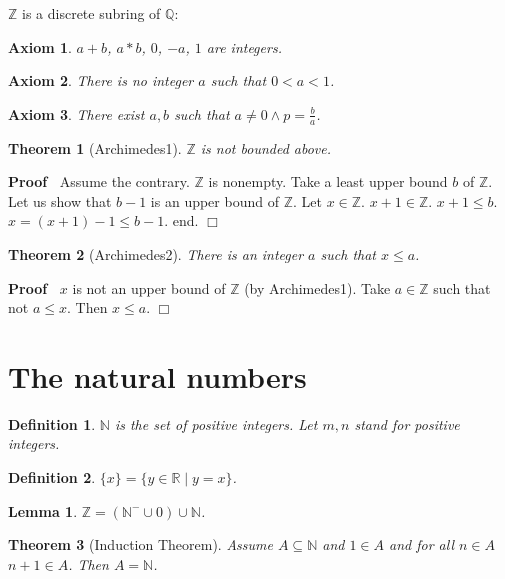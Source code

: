 \documentclass{article}
\newenvironment{proof}{\noindent\textbf{Proof\ }}{\hspace*{\fill}$\Box$\medskip}
\newtheorem{axiom}{Axiom}
\newtheorem{lemma}{Lemma}
\newtheorem{theorem}{Theorem}
\newtheorem{definition}{Definition}
\begin{document}
$\mathbb{Z}$ is a discrete subring of $\mathbb{Q}$:

\begin{axiom} $a + b$, $a * b$, $0$, $-a$, $1$ are integers.
\end{axiom}

\begin{axiom} There is no integer $a$ such that $0 < a < 1$.
\end{axiom}

\begin{axiom} There exist $a,b$ such that 
$a \neq 0 \wedge p = \frac{b}{a}$.
\end{axiom}

\begin{theorem}[Archimedes1] $\mathbb{Z}$ is not bounded above.
\end{theorem}
\begin{proof} Assume the contrary.
$\mathbb{Z}$ is nonempty. Take a least upper bound 
$b$ of $\mathbb{Z}$.
Let us show that $b - 1$ is an upper bound of $\mathbb{Z}$.
Let $x \in \mathbb{Z}$. $x + 1 \in \mathbb{Z}$. 
$x + 1 \leq b$.
$x = (x + 1) - 1 \leq b - 1$.
end.
\end{proof}

\begin{theorem}[Archimedes2] There is an integer $a$ 
such that $x \leq a$.\end{theorem}
\begin{proof} $x$ is not an upper bound of $\mathbb{Z}$ 
(by Archimedes1).
Take $a \in \mathbb{Z}$ such that not $a \leq x$.
Then $x \leq a$.
\end{proof}

\section{The natural numbers}

\begin{definition} $\mathbb{N}$ is the set of positive integers.
Let $m,n$ stand for positive integers.\end{definition}

\begin{definition} $\{x\} = \{y \in \mathbb{R} \mid y = x\}$.
\end{definition}

\begin{lemma} $\mathbb{Z} = ({\mathbb{N}}^- \cup {0}) \cup \mathbb{N}$.
\end{lemma}

\begin{theorem}[Induction Theorem] Assume $A \subseteq \mathbb{N}$ 
and $1 \in A$ and for all $n \in A$ $n + 1 \in A$.
Then $A = \mathbb{N}$.\end{theorem}
\end{document}
